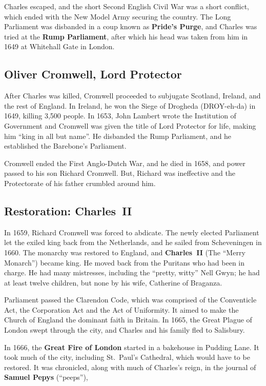 Charles escaped, and the short Second English Civil War was a short conflict,
which ended with the New Model Army securing the country.
The Long Parliament was disbanded in a coup known as \textbf{Pride's Purge},
and Charles was tried at the \textbf{Rump Parliament},
after which his head was taken from him in 1649 at Whitehall Gate in London.

\subsection*{Oliver Cromwell, Lord Protector}

After Charles was killed, Cromwell proceeded to subjugate Scotland, Ireland, and the rest of England.
In Ireland, he won the Siege of Drogheda (DROY-eh-da) in 1649, killing 3,500 people.
In 1653, John Lambert wrote the Institution of Government
and Cromwell was given the title of Lord Protector for life,
making him ``king in all but name''.
He disbanded the Rump Parliament, and he established the Barebone's Parliament.

Cromwell ended the First Anglo-Dutch War, and he died in 1658,
and power passed to his son Richard Cromwell.
But, Richard was ineffective and the Protectorate of his father crumbled around him.

\subsection*{Restoration: Charles~II}

In 1659, Richard Cromwell was forced to abdicate.
The newly elected Parliament let the exiled king back from the Netherlands,
and he sailed from Scheveningen in 1660.
The monarchy was restored to England, and \textbf{Charles~II} (The ``Merry Monarch'') became king.
He moved back from the Puritans who had been in charge.
He had many mistresses, including the ``pretty, witty'' Nell Gwyn;
he had at least twelve children, but none by his wife, Catherine of Braganza.

Parliament passed the Clarendon Code, which was comprised of
the Conventicle Act,
the Corporation Act
and the Act of Uniformity.
It aimed to make the Church of England the dominant faith in Britain.
In 1665, the Great Plague of London swept through the city,
and Charles and his family fled to Salisbury.

In 1666, the \textbf{Great Fire of London} started in a bakehouse in Pudding Lane.
It took much of the city, including St.\ Paul's Cathedral, which would have to be restored.
It was chronicled, along with much of Charles's reign,
in the journal of \textbf{Samuel Pepys} (``peeps''),

